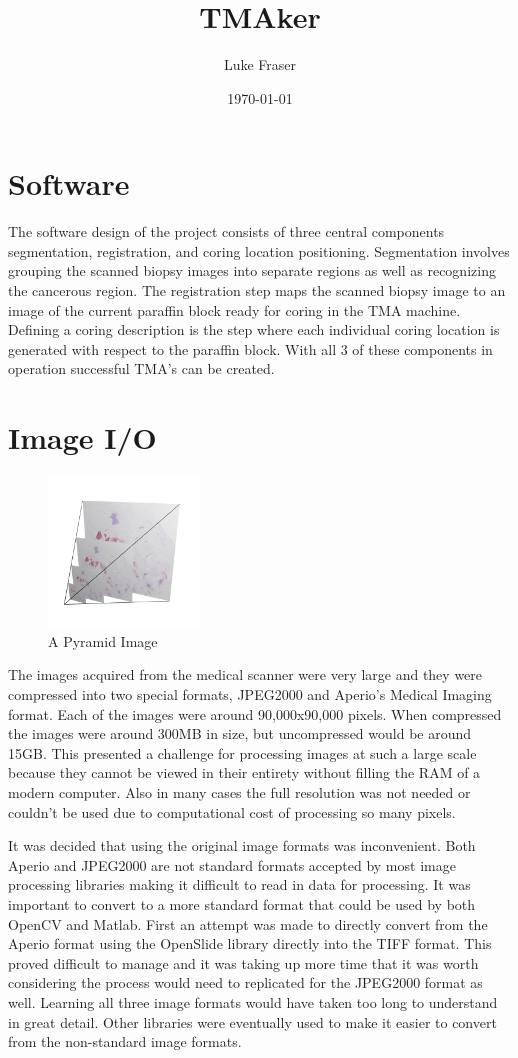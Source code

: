 \documentclass[a4paper,10pt,oneside]{article}
\author{Luke Fraser}
\title{TMAker}
\date{\today}
\begin{document}
\section{Software}
The software design of the project consists of three central components segmentation, registration, and coring location positioning. Segmentation involves grouping the scanned biopsy images into separate regions as well as recognizing the cancerous region. The registration step maps the scanned biopsy image to an image of the current paraffin block ready for coring in the TMA machine. Defining a coring description is the step where each individual coring location is generated with respect to the paraffin block. With all 3 of these components in operation successful TMA's can be created.

\section{Image I/O}

\begin{figure}[hbtp]
  \includegraphics[width=4cm]{visualization/Pyramid.PO13-00516A1_1_7_201305171148.png}
  \caption{A Pyramid Image}
  \label{fig:pyramidimage}
\end{figure}

The images acquired from the medical scanner were very large and they were compressed into two special formats, JPEG2000 and Aperio's Medical Imaging format. Each of the images were around 90,000x90,000 pixels. When compressed the images were around 300MB in size, but uncompressed would be around 15GB. This presented a challenge for processing images at such a large scale because they cannot be viewed in their entirety without filling the RAM of a modern computer. Also in many cases the full resolution was not needed or couldn't be used due to computational cost of processing so many pixels.

It was decided that using the original image formats was inconvenient. Both Aperio and JPEG2000 are not standard formats accepted by most image processing libraries making it difficult to read in data for processing. It was important to convert to a more standard format that could be used by both OpenCV and Matlab. First an attempt was made to directly convert from the Aperio format using the OpenSlide library directly into the TIFF format. This proved difficult to manage and it was taking up more time that it was worth considering the process would need to replicated for the JPEG2000 format as well. Learning all three image formats would have taken too long to understand in great detail. Other libraries were eventually used to make it easier to convert from the non-standard image formats.
\end{document}
